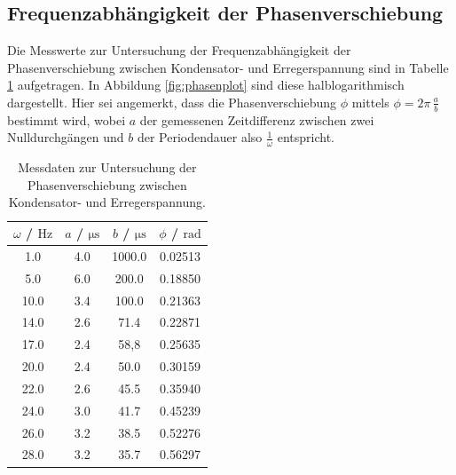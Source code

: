 \subsection{Frequenzabhängigkeit der Phasenverschiebung}

Die Messwerte zur Untersuchung der Frequenzabhängigkeit der Phasenverschiebung zwischen Kondensator- und Erregerspannung sind in Tabelle \ref{tab:muh} aufgetragen.
In Abbildung \ref{fig:phasenplot} sind diese halblogarithmisch dargestellt.
Hier sei angemerkt, dass die Phasenverschiebung $\phi$ mittels $\phi = 2\pi \, \frac{a}{b}$ bestimmt wird, wobei $a$ der gemessenen Zeitdifferenz zwischen zwei Nulldurchgängen und $b$ der Periodendauer also $\frac{1}{\omega}$ entspricht.

\begin{table}
	\caption{Messdaten zur Untersuchung der Phasenverschiebung zwischen Kondensator- und Erregerspannung.}
	\centering
	\label{tab:muh}
	\begin{tabular}{cccc}
		\toprule
		$\omega$ / $\si{\Hz}$ & $a$ / $\si{\micro\second}$ & $b$ / $\si{\micro\second}$ & $\phi$ / $\si{\radian}$ \\
		\midrule
		1.0                   & 4.0                        & 1000.0                     & 0.02513                 \\
		5.0                   & 6.0                        & 200.0                      & 0.18850                 \\
		10.0                  & 3.4                        & 100.0                      & 0.21363                 \\
		14.0                  & 2.6                        & 71.4                       & 0.22871                 \\
		17.0                  & 2.4                        & 58,8                       & 0.25635                 \\
		20.0                  & 2.4                        & 50.0                       & 0.30159                 \\
		22.0                  & 2.6                        & 45.5                       & 0.35940                 \\
		24.0                  & 3.0                        & 41.7                       & 0.45239                 \\
		26.0                  & 3.2                        & 38.5                       & 0.52276                 \\
		28.0                  & 3.2                        & 35.7                       & 0.56297                 \\

\end{tabular}
\end{table}
